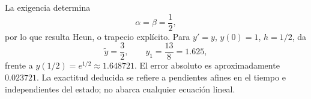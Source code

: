 La exigencia determina
\[
\alpha=\beta=\frac12,
\]
por lo que resulta Heun, o trapecio explícito. Para \(y'=y\), \(y(0)=1\), \(h=1/2\), da
\[
\widetilde y=\frac32,\qquad y_1=\frac{13}{8}=1.625,
\]
frente a \(y(1/2)=e^{1/2}\approx1.648721\). El error absoluto es aproximadamente \(0.023721\). La exactitud deducida se refiere a pendientes afines en el tiempo e independientes del estado; no abarca cualquier ecuación lineal.
